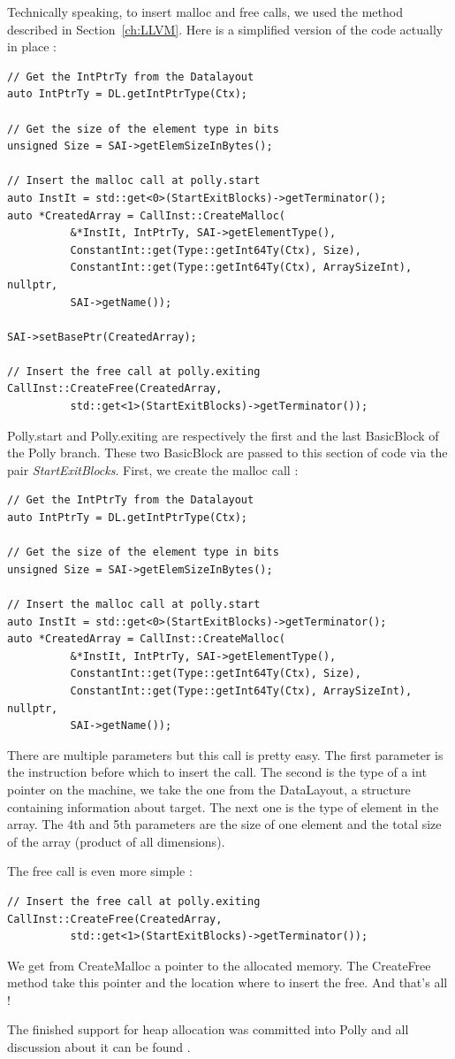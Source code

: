 Technically speaking, to insert malloc and free calls, we used the method described in Section~\ref{ch:LLVM}. Here is a simplified version of the code actually in place :
\begin{lstlisting}[frame=single]
// Get the IntPtrTy from the Datalayout
auto IntPtrTy = DL.getIntPtrType(Ctx);

// Get the size of the element type in bits
unsigned Size = SAI->getElemSizeInBytes();

// Insert the malloc call at polly.start
auto InstIt = std::get<0>(StartExitBlocks)->getTerminator();
auto *CreatedArray = CallInst::CreateMalloc(
          &*InstIt, IntPtrTy, SAI->getElementType(),
          ConstantInt::get(Type::getInt64Ty(Ctx), Size),
          ConstantInt::get(Type::getInt64Ty(Ctx), ArraySizeInt), nullptr,
          SAI->getName());

SAI->setBasePtr(CreatedArray);

// Insert the free call at polly.exiting
CallInst::CreateFree(CreatedArray,
          std::get<1>(StartExitBlocks)->getTerminator());
\end{lstlisting}
Polly.start and Polly.exiting are respectively the first and the last BasicBlock of the Polly branch. These two BasicBlock are passed to this section of code via the pair \emph{StartExitBlocks}.
First, we create the malloc call :
\begin{lstlisting}[frame=single]
// Get the IntPtrTy from the Datalayout
auto IntPtrTy = DL.getIntPtrType(Ctx);

// Get the size of the element type in bits
unsigned Size = SAI->getElemSizeInBytes();

// Insert the malloc call at polly.start
auto InstIt = std::get<0>(StartExitBlocks)->getTerminator();
auto *CreatedArray = CallInst::CreateMalloc(
          &*InstIt, IntPtrTy, SAI->getElementType(),
          ConstantInt::get(Type::getInt64Ty(Ctx), Size),
          ConstantInt::get(Type::getInt64Ty(Ctx), ArraySizeInt), nullptr,
          SAI->getName());
\end{lstlisting}
There are multiple parameters but this call is pretty easy. The first parameter is the instruction before which to insert the call. The second is the type of a int pointer on the machine, we take the one from the DataLayout, a structure containing information about target. The next one is the type of element in the array. The 4th and 5th parameters are the size of one element and the total size of the array (product of all dimensions).

The free call is even more simple :
\begin{lstlisting}[frame=single]
// Insert the free call at polly.exiting
CallInst::CreateFree(CreatedArray,
          std::get<1>(StartExitBlocks)->getTerminator());
\end{lstlisting}
We get from CreateMalloc a pointer to the allocated memory. The CreateFree method take this pointer and the location where to insert the free. And that's all !

The finished support for heap allocation was committed into Polly and all discussion about it can be found .